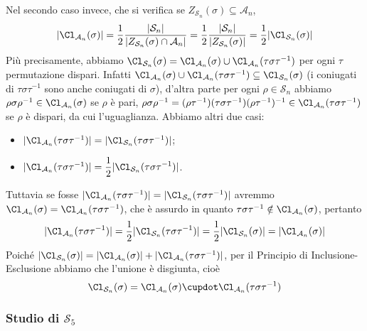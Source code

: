 \documentclass[11pt]{scrartcl}
\begin{document}
Nel secondo caso invece, che si verifica se $Z_{\mathcal{S}_n}(\sigma)\subseteq 
\mathcal{A}_n$,
\[
    |\Cl_{\mathcal{A}_n}(\sigma)| = \frac 1 2 \frac{|\mathcal{S}_n|}{|Z_{\mathcal{S}_n}(\sigma)\cap\mathcal{A}_n|}
    = \frac 1 2 \frac{|\mathcal{S}_n|}{|Z_{\mathcal{S}_n}(\sigma)|} = \frac 1 2 |\Cl_{\mathcal{S}_n}(\sigma)|
\]
Più precisamente, abbiamo $\Cl_{\mathcal{S}_n}(\sigma) = \Cl_{\mathcal{A}_n}(\sigma) \cup
\Cl_{\mathcal{A}_n}(\tau\sigma\tau^{-1})$ per ogni $\tau$ permutazione dispari. 
Infatti $\Cl_{\mathcal{A}_n}(\sigma) \cup \Cl_{\mathcal{A}_n}(\tau\sigma\tau^{-1})
\subseteq \Cl_{\mathcal{S}_n}(\sigma)$ (i coniugati di $\tau\sigma\tau^{-1}$ sono anche
coniugati di $\sigma$), d'altra parte per ogni $\rho \in \mathcal{S}_n$ abbiamo
$\rho\sigma\rho^{-1} \in \Cl_{\mathcal{A}_n}(\sigma)$ se $\rho$ è pari,
$\rho\sigma\rho^{-1} = (\rho\tau^{-1})(\tau\sigma\tau^{-1})(\rho\tau^{-1})^{-1}
\in \Cl_{\mathcal{A}_n}(\tau\sigma\tau^{-1})$ se $\rho$ è dispari, da cui l'uguaglianza.
Abbiamo altri due casi:
\begin{itemize}
    \item $|\Cl_{\mathcal{A}_n}(\tau\sigma\tau^{-1})| = |\Cl_{\mathcal{S}_n}(\tau\sigma\tau^{-1})|$;
    \item $|\Cl_{\mathcal{A}_n}(\tau\sigma\tau^{-1})| = \displaystyle\frac 1 2
    |\Cl_{\mathcal{S}_n}(\tau\sigma\tau^{-1})|$.
\end{itemize}
Tuttavia se fosse $|\Cl_{\mathcal{A}_n}(\tau\sigma\tau^{-1})| = |\Cl_{\mathcal{S}_n}(\tau\sigma\tau^{-1})|$
avremmo $\Cl_{\mathcal{A}_n}(\sigma) = \Cl_{\mathcal{A}_n}(\tau\sigma\tau^{-1})$,
che è assurdo in quanto $\tau\sigma\tau^{-1} \notin \Cl_{\mathcal{A}_n}(\sigma)$,
pertanto \[
    |\Cl_{\mathcal{A}_n}(\tau\sigma\tau^{-1})| = \displaystyle\frac 1 2
    |\Cl_{\mathcal{S}_n}(\tau\sigma\tau^{-1})| = \frac 1 2|\Cl_{\mathcal{S}_n}(\sigma)| =
    |\Cl_{\mathcal{A}_n}(\sigma)|
\]
Poiché 
$|\Cl_{\mathcal{S}_n}(\sigma)| = |\Cl_{\mathcal{A}_n}(\sigma)| + |\Cl_{\mathcal{A}_n}(\tau\sigma\tau^{-1})|$,
per il Principio di Inclusione-Esclusione abbiamo che l'unione è disgiunta,
cioè
\[
    \Cl_{\mathcal{S}_n}(\sigma) = \Cl_{\mathcal{A}_n}(\sigma) \cupdot \Cl_{\mathcal{A}_n}(\tau\sigma\tau^{-1})
\]

\subsubsection{Studio di $\mathcal{S}_5$}
\end{document}
